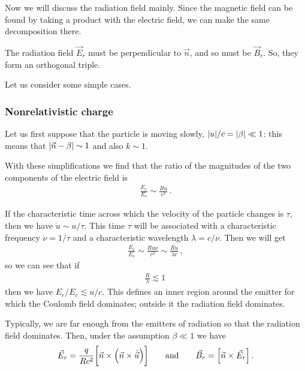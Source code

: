 \documentclass[main.tex]{subfiles}
\begin{document}
Now we will discuss the radiation field mainly. Since the magnetic field can be found by taking a product with the electric field, we can make the same decomposition there.

The radiation field \(\vec{E}_r\) must be perpendicular to \(\vec{n}\), and so must be \(\vec{B}_r\). So, they form an orthogonal triple. 

Let us consider some simple cases. 

\subsubsection{Nonrelativistic charge}

Let us first suppose that the particle is moving slowly, \(\abs{u}/ c = \abs{\beta } \ll 1 \): this means that \(\abs{\vec{n} - \beta } \sim 1\) and also \(k \sim 1\). 

With these simplifications we find that the ratio of the magnitudes of the two components of the electric field is  
%
\begin{align}
\frac{E_r}{E_c} \sim \frac{R \dot{u}}{c^2}
\,.
\end{align}

If the characteristic time across which the velocity of the particle changes is \(\tau \), then we have \(\dot{u} \sim u / \tau\). 
This time \(\tau \) will be associated with a characteristic frequency \(\nu = 1 / \tau \) and a characteristic wavelength \(\lambda = c / \nu \). 
Then we will get 
%
\begin{align}
\frac{E_r}{E_c} \sim \frac{R u \nu }{c^2} \sim \frac{R u}{\lambda c}
\,,
\end{align}
%
so we can see that if 
%
\begin{align}
\frac{R}{\lambda } \lesssim 1
\,
\end{align}
%
then we have \(E_r / E_c \lesssim u /c\). This defines an inner region around the emitter for which the Coulomb field dominates; outside it the radiation field dominates. 

Typically, we are far enough from the emitters of radiation so that the radiation field dominates. 
Then, under the assumption \(\beta \ll 1\) we have  
%
\begin{align}
\vec{E}_r = \frac{q}{Rc^2} \qty[\vec{n} \times \qty(\vec{n} \times \dot{\vec{u}})]
\qquad \text{and} \qquad
\vec{B}_r = \qty[\vec{n} \times \vec{E}_r]
\,.
\end{align}
\end{document}

